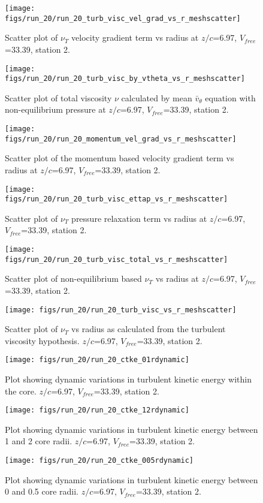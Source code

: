 \begin{figure}[H]
\centering
\texttt{[image: figs/run\_20/run\_20\_turb\_visc\_vel\_grad\_vs\_r\_meshscatter]}
\caption{Scatter plot of $\nu_T$ velocity gradient term vs radius at $z/c$=6.97, $V_{free}$=33.39, station 2.}
\end{figure}


\begin{figure}[H]
\centering
\texttt{[image: figs/run\_20/run\_20\_turb\_visc\_by\_vtheta\_vs\_r\_meshscatter]}
\caption{Scatter plot of total viscosity $\nu$ calculated by mean $\bar{v}_{\theta}$ equation with non-equilibrium pressure at $z/c$=6.97, $V_{free}$=33.39, station 2.}
\end{figure}


\begin{figure}[H]
\centering
\texttt{[image: figs/run\_20/run\_20\_momentum\_vel\_grad\_vs\_r\_meshscatter]}
\caption{Scatter plot of the momentum based velocity gradient term vs radius at $z/c$=6.97, $V_{free}$=33.39, station 2.}
\end{figure}


\begin{figure}[H]
\centering
\texttt{[image: figs/run\_20/run\_20\_turb\_visc\_ettap\_vs\_r\_meshscatter]}
\caption{Scatter plot of $\nu_T$ pressure relaxation term vs radius at $z/c$=6.97, $V_{free}$=33.39, station 2.}
\end{figure}


\begin{figure}[H]
\centering
\texttt{[image: figs/run\_20/run\_20\_turb\_visc\_total\_vs\_r\_meshscatter]}
\caption{Scatter plot of non-equilibrium based $\nu_T$ vs radius at $z/c$=6.97, $V_{free}$=33.39, station 2.}
\end{figure}


\begin{figure}[H]
\centering
\texttt{[image: figs/run\_20/run\_20\_turb\_visc\_vs\_r\_meshscatter]}
\caption{Scatter plot of $\nu_T$ vs radius as calculated from the turbulent viscosity hypothesis. $z/c$=6.97, $V_{free}$=33.39, station 2.}
\end{figure}


\begin{figure}[H]
\centering
\texttt{[image: figs/run\_20/run\_20\_ctke\_01rdynamic]}
\caption{Plot showing dynamic variations in turbulent kinetic energy within the core. $z/c$=6.97, $V_{free}$=33.39, station 2.}
\end{figure}


\begin{figure}[H]
\centering
\texttt{[image: figs/run\_20/run\_20\_ctke\_12rdynamic]}
\caption{Plot showing dynamic variations in turbulent kinetic energy between 1 and 2 core radii. $z/c$=6.97, $V_{free}$=33.39, station 2.}
\end{figure}


\begin{figure}[H]
\centering
\texttt{[image: figs/run\_20/run\_20\_ctke\_005rdynamic]}
\caption{Plot showing dynamic variations in turbulent kinetic energy between 0 and 0.5 core radii. $z/c$=6.97, $V_{free}$=33.39, station 2.}
\end{figure}


